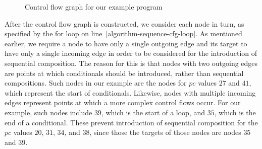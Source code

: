 \begin{figure}
  \begin{center}
    \footnotesize
  \end{center}
  \caption{Control flow graph for our example program}
  \label{example-control-flow-graph-figure}
\end{figure}

After the control flow graph is constructed, we consider each node in
turn, as specified by the for loop on
line~\ref{algorithm-sequence-cfg-loop}.
As mentioned earlier, we require a node to have only a single outgoing
edge and its target to have only a single incoming edge in order to be
considered for the introduction of sequential composition.
The reason for this is that nodes with two outgoing edges are points
at which conditionals should be introduced, rather than sequential
compositions.
Such nodes in our example are the nodes for $pc$ values $27$ and $41$,
which represent the start of conditionals.
Likewise, nodes with multiple incoming edges represent points at which
a more complex control flows occur.
For our example, such nodes include $39$, which is the start of a
loop, and $35$, which is the end of a conditional.
These prevent introduction of sequential composition for the $pc$
values $20$, $31$, $34$, and $38$, since those the targets of those
nodes are nodes $35$ and $39$.


